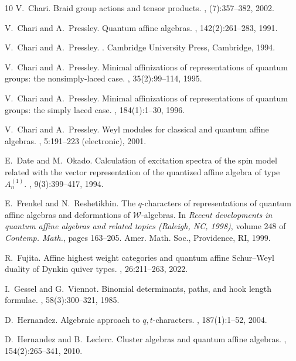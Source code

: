 \documentclass[11pt,reqno]{amsart}
\theoremstyle{definition} \newtheorem*{defn}{Definition}
\theoremstyle{definition}
\numberwithin{equation}{section}
\begin{document}
\begin{thebibliography}{10}
V.~Chari.
\newblock Braid group actions and tensor products.
, (7):357--382, 2002.

V.~Chari and A.~Pressley.
\newblock Quantum affine algebras.
, 142(2):261--283, 1991.

V.~Chari and A.~Pressley.
.
\newblock Cambridge University Press, Cambridge, 1994.

V.~Chari and A.~Pressley.
\newblock Minimal affinizations of representations of quantum groups: the nonsimply-laced case.
, 35(2):99--114, 1995.

V.~Chari and A.~Pressley.
\newblock Minimal affinizations of representations of quantum groups: the simply laced case.
, 184(1):1--30, 1996.

V.~Chari and A.~Pressley.
\newblock Weyl modules for classical and quantum affine algebras.
, 5:191--223 (electronic), 2001.

E.~Date and M.~Okado.
\newblock Calculation of excitation spectra of the spin model related with the vector representation of the quantized affine algebra of type {$A^{(1)}_n$}.
, 9(3):399--417, 1994.

E.~Frenkel and N.~Reshetikhin.
\newblock The {$q$}-characters of representations of quantum affine algebras and deformations of {$\mathcal{W}$}-algebras.
\newblock In {\em Recent developments in quantum affine algebras and related topics ({R}aleigh, {NC}, 1998)}, volume 248 of {\em Contemp. Math.}, pages 163--205. Amer. Math. Soc., Providence, RI, 1999.

R.~Fujita.
\newblock Affine highest weight categories and quantum affine {S}chur--{W}eyl duality of {D}ynkin quiver types.
, 26:211--263, 2022.

I.~Gessel and G.~Viennot.
\newblock Binomial determinants, paths, and hook length formulae.
, 58(3):300--321, 1985.

D.~Hernandez.
\newblock Algebraic approach to $q,t$-characters.
, 187(1):1--52, 2004.

D.~Hernandez and B.~Leclerc.
\newblock Cluster algebras and quantum affine algebras.
, 154(2):265--341, 2010.


\end{thebibliography}
\end{document}
